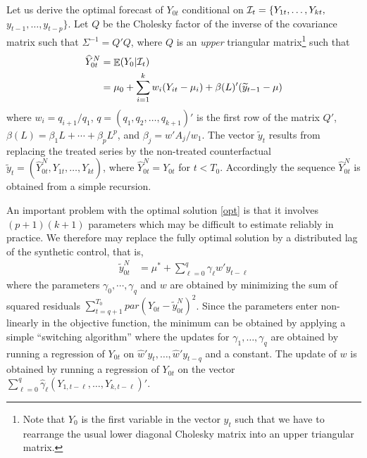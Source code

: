 \documentclass[12pt,a4paper]{article}
\def\E{\mathop{\mathbb{E}}\limits}
\begin{document}
Let us derive the optimal forecast of $Y_{0t}$ conditional on ${\cal I}_t=\{Y_{1t},\ldots,Y_{kt},$ $y_{t-1},\ldots,y_{t-p}\}$. Let $Q$ be the Cholesky factor of the inverse of the covariance matrix such that $\Sigma^{-1}=Q'Q$, where $Q$ is an {\it upper} triangular matrix\footnote{Note that $Y_0$ is the first variable in the vector $y_t$ such that we have to rearrange the usual lower diagonal Cholesky matrix into an upper triangular matrix.} such that
\begin{align}
\widehat Y_{0t}^N &= \E( Y_0|{\cal I}_t ) \notag \\
&= \mu_0 + \sum_{i=1}^k w_i (Y_{it}-\mu_i) + \beta(L)'(\widetilde y_{t-1}-\mu)  \label{opt}
\end{align}
where $w_i=q_{i+1}/q_1$, $q=(q_1,q_2,\ldots,q_{k+1})'$ is the first row of the matrix $Q'$, $\beta(L)= \beta_1 L + \cdots + \beta_{p} L^{p}$, and $\beta_j=w'A_j/w_1$. The vector $\widetilde y_t$ results from replacing the treated series by the non-treated counterfactual $\widetilde y_t = (\widehat Y_{0t}^N,Y_{1t},\ldots,Y_{kt})$, where $\widehat Y_{0t}^N=Y_{0t}$ for $t< T_0$. Accordingly the sequence $\widehat Y_{0t}^N$ is obtained from a simple recursion.

An important problem with the optimal solution \eqref{opt} is that it involves $(p+1)(k+1)$ parameters which may be difficult to estimate reliably in practice. We therefore may replace the fully optimal solution by a distributed lag of the synthetic control, that is,
\begin{align}
\widetilde y_{0t}^N &= \mu^* + \sum_{\ell=0}^q \gamma_\ell w'y_{t-\ell}
\end{align}
where the parameters $\gamma_0,\cdots,\gamma_q$ and $w$ are obtained by minimizing the sum of squared residuals $\sum_{t=q+1}^{T_0} par(Y_{0t}-\widetilde y_{0t}^N)^2$. Since the parameters enter non-linearly in the objective function, the minimum can be obtained by applying a simple ``switching algorithm'' where the updates for $\gamma_1,\ldots,\gamma_q$ are obtained by running a regression of  $Y_{0t}$ on $\widehat w'y_t,\ldots,\widehat w'y_{t-q}$ and a constant. The update of $w$ is obtained by running a regression of $Y_{0t}$ on the vector $\sum_{\ell=0}^q \widehat \gamma_\ell (Y_{1,t-\ell},\ldots,Y_{k,t-\ell})'$.
\end{document}
